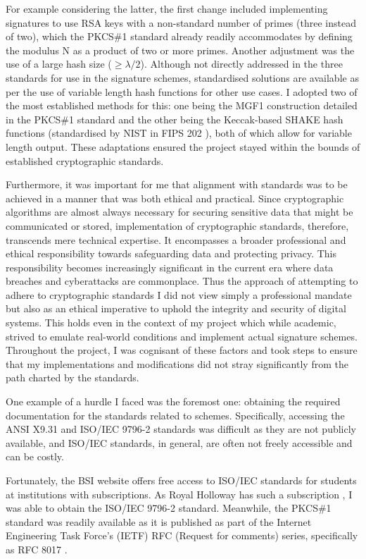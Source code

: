 \documentclass[]{final_report}
\theoremstyle{definition}
\begin{document}
For example considering the latter, the first change included implementing  signatures to use RSA keys with a non-standard number of primes (three instead of two), which the PKCS\#1 standard already readily accommodates by defining the modulus N as a product of two or more primes. Another adjustment was the use of a large hash size ($\geq \lambda/2$). Although not directly addressed in the three standards for use in the signature schemes, standardised solutions are available as per the use of variable length hash functions for other use cases.  I adopted two of the most established methods for this: one being the MGF1 construction detailed in the PKCS\#1 standard \cite{rfc8017} and the other being the Keccak-based SHAKE hash functions (standardised by NIST in FIPS 202 \cite{1421}), both of which allow for variable length output. These adaptations ensured the project stayed within the bounds of established cryptographic standards. 

Furthermore, it was important for me that alignment with standards was to be achieved in a manner that was both ethical and practical. Since cryptographic algorithms are almost always necessary for securing sensitive data that might be communicated or stored, implementation of cryptographic standards, therefore, transcends mere technical expertise. It encompasses a broader professional and ethical responsibility towards safeguarding data and protecting privacy. This responsibility becomes increasingly significant in the current era where data breaches and cyberattacks are commonplace. Thus the approach of attempting to adhere to cryptographic standards I did not view simply a professional mandate but also as an ethical imperative to uphold the integrity and security of digital systems. This holds even in the context of my project which while academic, strived to emulate real-world conditions and implement actual signature schemes.
Throughout the project, I was cognisant of these factors and took steps to ensure that my implementations and modifications did not stray significantly from the path charted by the standards.

One example of a hurdle I faced was the foremost one: obtaining the required documentation for the standards related to schemes. Specifically, accessing the ANSI X9.31 and ISO/IEC 9796-2 standards was difficult as they are not publicly available, and ISO/IEC standards, in general, are often not freely accessible and can be costly.

Fortunately, the BSI website offers free access to ISO/IEC standards for students at institutions with subscriptions. As Royal Holloway has such a subscription \cite{BSIWebsite}, I was able to obtain the ISO/IEC 9796-2 standard. Meanwhile, the PKCS\#1 standard was readily available as it is published as part of the Internet Engineering Task Force's (IETF) RFC (Request for comments) series, specifically as RFC 8017 \cite{rfc8017}.
\end{document}
